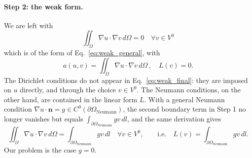 \documentclass{article}
\newcommand{\tmop}[1]{\ensuremath{\operatorname{#1}}}
\begin{document}
\paragraph{Step 2: the weak form.} We are left with
\begin{equation}
  \label{eq:weak_final}
  \iint_{\Omega} \nabla u \cdot \nabla v \, d\Omega = 0 \quad \forall v \in V^0
\end{equation}
which is of the form of Eq.~\eqref{eq:weak_general}, with
\[ a (u, v) = \iint_{\Omega} \nabla u \cdot \nabla v \, d\Omega \,, \quad L (v) = 0 . \]
The Dirichlet conditions do not appear in Eq.~\eqref{eq:weak_final}: they are
imposed on $u$ directly, and through the choice $v \in V^0$. The Neumann
conditions, on the other hand, are contained in the linear form $L$. With a
general Neumann condition $\nabla u \cdot \mathbf{n} = g \in C^0 (\partial
\Omega_{\tmop{Neumann}})$, the second boundary term in Step 1 no longer vanishes but
equals $\int_{\partial \Omega_{\tmop{Neumann}}} g v \, dl$, and the same derivation
gives
\begin{equation}
  \label{eq:weak_neumann}
  \iint_{\Omega} \nabla u \cdot \nabla v \, d\Omega = \int_{\partial
  \Omega_{\tmop{Neumann}}} g v \, dl \quad \forall v \in V^0 ,
  \qquad \text{i.e.} \quad L (v) = \int_{\partial \Omega_{\tmop{Neumann}}} g v \, dl .
\end{equation}
Our problem is the case $g = 0$.
\end{document}
